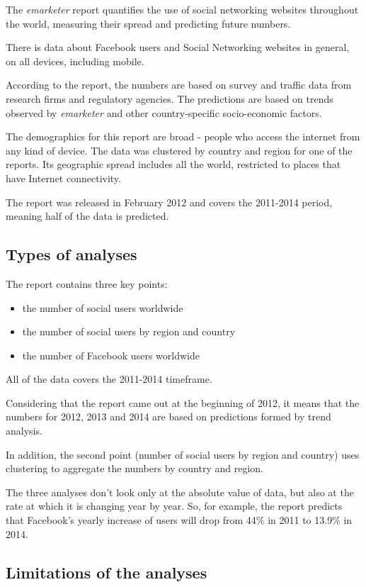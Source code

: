 \documentclass{acm_proc_10ptArticle-sp}
\begin{document}
The \textit{emarketer} report quantifies the use of social networking websites throughout the world, measuring their spread and predicting future numbers. 

There is data about Facebook users and Social Networking websites in general, on all devices, including mobile.

According to the report, the numbers are based on survey and traffic data from research firms and regulatory agencies. The predictions are based on trends observed by \textit{emarketer} and other country-specific socio-economic factors.

The demographics for this report are broad - people who access the internet from any kind of device. The data was clustered by country and region for one of the reports. Its geographic spread includes all the world, restricted to places that have Internet connectivity.

The report was released in February 2012 and covers the 2011-2014 period, meaning half of the data is predicted.


\subsection{Types of analyses}
The report contains three key points:

\begin{itemize}
\item the number of social users worldwide
\item the number of social users by region and country
\item the number of Facebook users worldwide
\end{itemize}

All of the data covers the 2011-2014 timeframe.

Considering that the report came out at the beginning of 2012, it means that the numbers for 2012, 2013 and 2014 are based on predictions formed by trend analysis.

In addition, the second point (number of social users by region and country) uses clustering to aggregate the numbers by country and region.

The three analyses don't look only at the absolute value of data, but also at the rate at which it is changing year by year. So, for example, the report predicts that Facebook's yearly increase of users will drop from 44\% in 2011 to 13.9\% in 2014.


\subsection{Limitations of the analyses}
\end{document}
